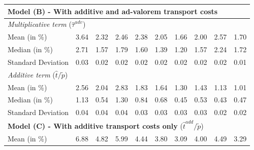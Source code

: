 \documentclass[11pt,twoside, authoryear]{elsarticle}
\begin{document}
\begin{table}[htbp]
{\begin{tabular}{l|c c c c c c c c c}
    \multicolumn{10}{l}{\textbf{Model (B) - With additive and ad-valorem transport costs}} \\ \hline
     \multicolumn{10}{l}{ \textit{Multiplicative term} ($\widehat{\tau}^{adv}$)} \\ \hline
    Mean (in \%) & \multicolumn{1}{c}{3.64} & \multicolumn{1}{c}{2.32} & \multicolumn{1}{c}{2.46} & \multicolumn{1}{c}{2.38} & \multicolumn{1}{c}{2.05} & \multicolumn{1}{c}{1.66} & \multicolumn{1}{c}{2.00} & \multicolumn{1}{c}{2.57} & \multicolumn{1}{c}{1.70} \\
    Median (in \%)& \multicolumn{1}{c}{2.71} & \multicolumn{1}{c}{1.57} & \multicolumn{1}{c}{1.79} & \multicolumn{1}{c}{1.60} & \multicolumn{1}{c}{1.39} & \multicolumn{1}{c}{1.20} & \multicolumn{1}{c}{1.57} & \multicolumn{1}{c}{2.24} & \multicolumn{1}{c}{1.72} \\
    Standard Deviation & \multicolumn{1}{c}{0.03} & \multicolumn{1}{c}{0.02} & \multicolumn{1}{c}{0.02} & \multicolumn{1}{c}{0.02} & \multicolumn{1}{c}{0.02} & \multicolumn{1}{c}{0.02} & \multicolumn{1}{c}{0.02} & \multicolumn{1}{c}{0.02} & \multicolumn{1}{c}{0.01} \\ \hline
      \multicolumn{10}{l}{\textit{Additive term} ($\widehat{t}/\widetilde{p}$)} \\ \hline
    Mean (in \%) & \multicolumn{1}{c}{2.56} & \multicolumn{1}{c}{2.04} & \multicolumn{1}{c}{2.83} & \multicolumn{1}{c}{1.83} & \multicolumn{1}{c}{1.64} & \multicolumn{1}{c}{1.30} & \multicolumn{1}{c}{1.43} & \multicolumn{1}{c}{1.13} & \multicolumn{1}{c}{1.01} \\
    Median (in \%)& \multicolumn{1}{c}{1.13} & \multicolumn{1}{c}{0.54} & \multicolumn{1}{c}{1.30} & \multicolumn{1}{c}{0.84} & \multicolumn{1}{c}{0.68} & \multicolumn{1}{c}{0.45} & \multicolumn{1}{c}{0.53} & \multicolumn{1}{c}{0.43} & \multicolumn{1}{c}{0.47} \\
    Standard Deviation & \multicolumn{1}{c}{0.04} & \multicolumn{1}{c}{0.04} & \multicolumn{1}{c}{0.04} & \multicolumn{1}{c}{0.03} & \multicolumn{1}{c}{0.03} & \multicolumn{1}{c}{0.03} & \multicolumn{1}{c}{0.03} & \multicolumn{1}{c}{0.02} & \multicolumn{1}{c}{0.02} \\ \hline
    \multicolumn{10}{l}{\textbf{Model (C) - With additive transport costs only} ($\widehat{t}^{add}/\widetilde{p}$)} \\ \hline
    Mean (in \%) & \multicolumn{1}{c}{6.88} & \multicolumn{1}{c}{4.82} & \multicolumn{1}{c}{5.99} & \multicolumn{1}{c}{4.44} & \multicolumn{1}{c}{3.80} & \multicolumn{1}{c}{3.09} & \multicolumn{1}{c}{4.00} & \multicolumn{1}{c}{4.49} & \multicolumn{1}{c}{3.29} \\

\end{tabular}}
\end{table}
\end{document}
